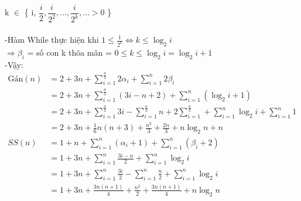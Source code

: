 \documentclass[12pt, letterpaper]{article}
\begin{document}
     k $\in$ \{ i, $\dfrac{i}{2}, \dfrac{i}{2^2}, \ldots, \dfrac{i}{2^k}, \ldots >0$ \} \\ \\
	-Hàm While thực hiện khi $1 \leq \frac{1}{2^k}  \Leftrightarrow k \leq \log_2 i$\\  
	$\Rightarrow \beta_i$ = số \space con k thõa mãn = $0 \leq k \leq \log_2 i = \log_2 i+1$\\
	-Vậy: \\
	$ \begin{aligned}
		\text{Gán}(n) & = 2 + 3n + \sum^{\frac{n}{3} }_{i = 1} 2 \alpha_i  + \sum^{n}_{i = 1} 2 \beta_i\\
		& = 2 + 3n + \sum^{\frac{n}{3} }_{i = 1} (3i -n + 2) + \sum^{n}_{i = 1}(\log_2 i+1)\\
			& = 2 + 3n + \sum^{\frac{n}{3} }_{i = 1} 3i - \sum^{\frac{n}{3} }_{i = 1}n + 2\sum^{\frac{n}{3} }_{i = 1}  + \sum^{n}_{i = 1}\log_2 i+\sum^{n}_{i = 1}1\\
			& = 2 + 3n + \frac{1}{6}n(n+3) + \frac{n^2}{3} +\frac{2n}{3} + n\log_2n + n\
			\\SS(n) & = 1 + n + \sum^{n}_{i = 1} (\alpha_i  + 1) + \sum^{n}_{i = 1} ( \beta_i + 2)\\
			& = 1 + 3n + \sum^{n}_{i = 1} \frac{3i - n}{2} + \sum^{n}_{i = 1}\log_2 i\\
			& = 1 + 3n + \sum^{n}_{i = 1} \frac{3i}{2} - \sum^{n}_{i = 1} \frac{n}{2}+\sum^{n}_{i = 1}\log_2 i\\
			& = 1 + 3n + \frac{3n(n+1)}{4}+ \frac{n^2}{2}+ \frac{3n(n+1)}{4} + n\log_2n\\
	\end{aligned} $ \\
\end{document}
